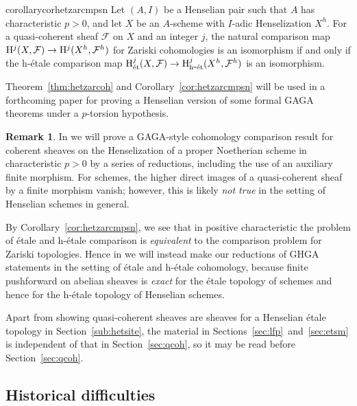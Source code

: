 \documentclass[12pt]{article}
\newcommand{\F}{\mathcal{F}}
\newcommand{\G}{\mathcal{G}}
\newcommand{\sph}{{\rm Sph}}
\newcommand{\Et}{\'etale\xspace}
\newcommand{\hetale}{h-\'etale\xspace}
\newcommand{\et}{{\rm\acute{e}t}}
\newcommand{\het}{{\rm h\mbox{-}\et}}
\renewcommand{\H}{{\rm H}}
\theoremstyle{definition}
\newtheorem{remark}[theorem]{Remark}
\numberwithin{equation}{subsection}
\begin{document}
\begin{restatable*}{corollary}{corhetzarcmpsn}\label{cor:hetzarcmpsn} Let $(A,I)$ be a Henselian pair such that $A$ has characteristic $p > 0$, and let $X$ be an $A$-scheme with $I$-adic Henselization $X^h$. For a quasi-coherent sheaf $\F$ on $X$ and an integer $j$, the natural comparison map $\H^j(X,\F) \to \H^j(X^h,\F^h)$ for Zariski cohomologies is an isomorphism if and only if the \hetale comparison map $\hjet(\xet,\fet) \to \hjhet(\xhhet,\fhhet)$ is an isomorphism.
\end{restatable*}

Theorem~\ref{thm:hetzarcoh} and Corollary~\ref{cor:hetzarcmpsn} will be used in a forthcoming paper \cite{ghga} for proving a Henselian version of some formal GAGA theorems under a $p$-torsion hypothesis. 

\begin{remark}\label{rmk:ghgahet}
In \cite{ghga} we will prove a GAGA-style cohomology comparison result for coherent sheaves on the Henselization of a proper Noetherian scheme in characteristic $p>0$ by a series of reductions, including the use of an auxiliary finite morphism. For schemes, the higher direct images of a quasi-coherent sheaf by a finite morphism vanish; however, this is likely {\it not true} in the setting of Henselian schemes in general. 

By Corollary~\ref{cor:hetzarcmpsn}, we see that in positive characteristic the problem of \Et and \hetale comparison is {\it equivalent} to the comparison problem for Zariski topologies. Hence in \cite{ghga} we will instead make our reductions of GHGA statements in the setting of \Et and \hetale cohomology, because finite pushforward on abelian sheaves is {\it exact} for the \Et topology of schemes and hence for the \hetale topology of Henselian schemes. 
\end{remark}


Apart from showing quasi-coherent sheaves are sheaves for a Henselian \'etale topology in Section~\ref{sub:hetsite}, the material in Sections~\ref{sec:lfp}~and~\ref{sec:etsm} is independent of that in Section~\ref{sec:qcoh}, so it may be read before Section~\ref{sec:qcoh}. 

\renewcommand{\xhhet}{X^h}
\renewcommand{\xhet}{X}
\renewcommand{\fhhet}{\F^h}
\renewcommand{\xet}{X}
\renewcommand{\fet}{\F}
\renewcommand{\ghet}{\G}
\renewcommand{\sphai}{\sph(A)}
\renewcommand{\hjet}{\H^j_{\et}}
\renewcommand{\hjhet}{\H^j_{\het}}

\subsection{Historical difficulties}\label{sub:diff}
\end{document}
